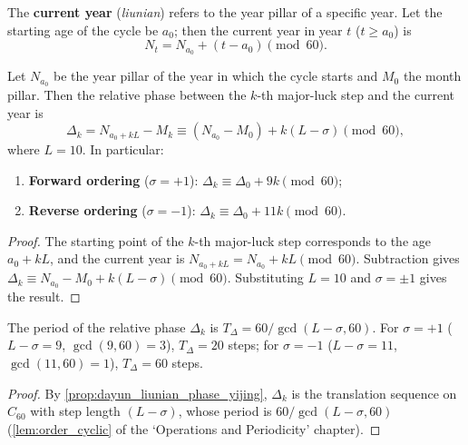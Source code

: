 \begin{definition}\label{def:liunian_yijing}
The \textbf{current year} (\textit{liunian}) refers to the year pillar of a specific year. Let the starting age of the cycle be $a_0$; then the current year in year $t$ ($t\ge a_0$) is
\[
N_t=N_{a_0}+(t-a_0)\pmod{60}.
\]
\end{definition}

\begin{proposition}\label{prop:dayun_liunian_phase_yijing}
Let $N_{a_0}$ be the year pillar of the year in which the cycle starts and $M_0$ the month pillar. Then the relative phase between the $k$-th major-luck step and the current year is
\[
\Delta_k=N_{a_0+kL}-M_k\equiv (N_{a_0}-M_0)+k(L-\sigma)\pmod{60},
\]
where $L=10$. In particular:
\begin{enumerate}[label=(\roman*)]
    \item \textbf{Forward ordering} ($\sigma=+1$): $\Delta_k\equiv\Delta_0+9k\pmod{60}$;
    \item \textbf{Reverse ordering} ($\sigma=-1$): $\Delta_k\equiv\Delta_0+11k\pmod{60}$.
\end{enumerate}
\end{proposition}

\begin{proof}
The starting point of the $k$-th major-luck step corresponds to the age $a_0+kL$, and the current year is $N_{a_0+kL}=N_{a_0}+kL\pmod{60}$. Subtraction gives $\Delta_k\equiv N_{a_0}-M_0+k(L-\sigma)\pmod{60}$. Substituting $L=10$ and $\sigma=\pm 1$ gives the result.
\end{proof}

\begin{corollary}\label{cor:dayun_liunian_period_yijing}
The period of the relative phase $\Delta_k$ is $T_\Delta=60/\gcd(L-\sigma,60)$. For $\sigma=+1$ ($L-\sigma=9$, $\gcd(9,60)=3$), $T_\Delta=20$ steps; for $\sigma=-1$ ($L-\sigma=11$, $\gcd(11,60)=1$), $T_\Delta=60$ steps.
\end{corollary}

\begin{proof}
By \cref{prop:dayun_liunian_phase_yijing}, $\Delta_k$ is the translation sequence on $C_{60}$ with step length $(L-\sigma)$, whose period is $60/\gcd(L-\sigma,60)$ (\cref{lem:order_cyclic} of the `Operations and Periodicity' chapter).
\end{proof}

